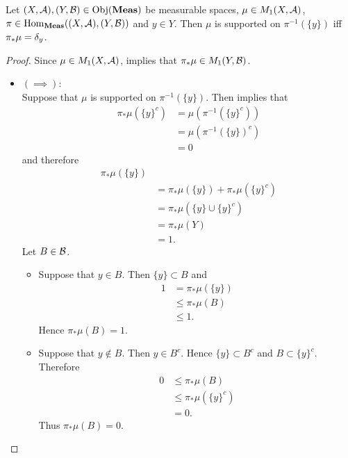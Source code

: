 \documentclass{book}
\begin{document}
	\begin{ex}  
		Let $(X, \mathcal{A}), (Y, \mathcal{B}) \in \operatorname{Obj}(\operatorname{\text{\textbf{Meas}}})$ be measurable spaces, $\mu \in M_1(X, \mathcal{A})$, $\pi \in \operatorname{Hom}_{\operatorname{\text{\textbf{Meas}}}}((X, \mathcal{A}), (Y, \mathcal{B}))$ and $y \in Y$. Then $\mu$ is supported on $\pi^{-1}(\{y\})$ iff $\pi_*\mu = \delta_y$. 
	\end{ex}
	
	\begin{proof}
		Since $\mu \in M_1(X, \mathcal{A})$,  implies that $\pi_* \mu \in M_1(Y, \mathcal{B})$.  
		\begin{itemize}
			\item $(\implies)$: \\
			Suppose that $\mu$ is supported on $\pi^{-1}(\{y\})$. Then  implies that 
			\begin{align*}
				\pi_*\mu(\{y\}^c)
				& = \mu(\pi^{-1}(\{y\}^c)) \\
				& = \mu(\pi^{-1}(\{y\})^c) \\
				& = 0
			\end{align*}
			and therefore
			\begin{align*}
				\pi_*\mu(\{y\}) \\
				& = \pi_*\mu(\{y\}) + \pi_*\mu(\{y\}^c) \\
				& = \pi_*\mu(\{y\} \cup \{y\}^c) \\
				& = \pi_*\mu(Y) \\
				& = 1.
			\end{align*}
			Let $B \in \mathcal{B}$. 
			\begin{itemize}
				\item Suppose that $y \in B$. Then $\{y\} \subset B$ and 
				\begin{align*}
					1
					& = \pi_*\mu(\{y\}) \\
					& \leq \pi_*\mu(B) \\
					& \leq 1.
				\end{align*}
				Hence $\pi_*\mu(B) = 1$.
				\item Suppose that $y \not \in B$. Then $y \in B^c$. Hence $\{y\} \subset B^c$ and $B \subset \{y\}^c$. Therefore 
				\begin{align*}
					0
					& \leq \pi_*\mu(B) \\
					& \leq \pi_*\mu(\{y\}^c) \\
					& = 0.
				\end{align*}
				Thus $\pi_*\mu(B) = 0$.  
			\end{itemize}

\end{itemize}
\end{proof}
\end{document}
